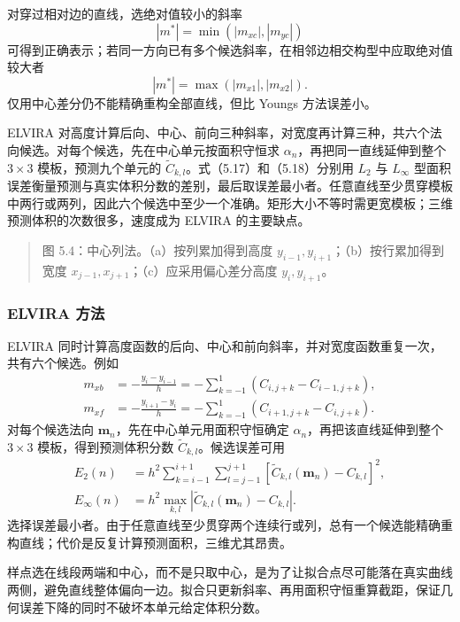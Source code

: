 \documentclass[11pt,a4paper,openany,fontset=none]{ctexbook}
\begin{document}
对穿过相对边的直线，选绝对值较小的斜率
\begin{equation}
|m^*|=\min(|m_{xc}|,|m_{yc}|)
\tag{5.14}
\end{equation}
可得到正确表示；若同一方向已有多个候选斜率，在相邻边相交构型中应取绝对值较大者
\begin{equation}
|m^*|=\max(|m_{x1}|,|m_{x2}|).
\tag{5.15}
\end{equation}
仅用中心差分仍不能精确重构全部直线，但比 Youngs 方法误差小。

ELVIRA 对高度计算后向、中心、前向三种斜率，对宽度再计算三种，共六个法向候选。对每个候选，先在中心单元按面积守恒求 $\alpha_n$，再把同一直线延伸到整个 $3\times3$ 模板，预测九个单元的 $\widetilde C_{k,l}$。式（5.17）和（5.18）分别用 $L_2$ 与 $L_\infty$ 型面积误差衡量预测与真实体积分数的差别，最后取误差最小者。任意直线至少贯穿模板中两行或两列，因此六个候选中至少一个准确。矩形大小不等时需更宽模板；三维预测体积的次数很多，速度成为 ELVIRA 的主要缺点。

\begin{quote}\small 图 5.4：中心列法。（a）按列累加得到高度 $y_{i-1},y_{i+1}$；（b）按行累加得到宽度 $x_{j-1},x_{j+1}$；（c）应采用偏心差分高度 $y_i,y_{i+1}$。\end{quote}
\subsubsection{ELVIRA 方法}

ELVIRA 同时计算高度函数的后向、中心和前向斜率，并对宽度函数重复一次，共有六个候选。例如
\begin{align}
m_{xb}&=-\frac{y_i-y_{i-1}}{h}
=-\sum_{k=-1}^{1}(C_{i,j+k}-C_{i-1,j+k}),\\
m_{xf}&=-\frac{y_{i+1}-y_i}{h}
=-\sum_{k=-1}^{1}(C_{i+1,j+k}-C_{i,j+k}).
\tag{5.16}
\end{align}
对每个候选法向 $\bm m_n$，先在中心单元用面积守恒确定 $\alpha_n$，再把该直线延伸到整个 $3\times3$ 模板，得到预测体积分数 $\widetilde C_{k,l}$。候选误差可用
\begin{align}
E_2(n)&=h^2\sum_{k=i-1}^{i+1}\sum_{l=j-1}^{j+1}
[\widetilde C_{k,l}(\bm m_n)-C_{k,l}]^2,
\tag{5.17}\\
E_\infty(n)&=h^2\max_{k,l}|\widetilde C_{k,l}(\bm m_n)-C_{k,l}|.
\tag{5.18}
\end{align}
选择误差最小者。由于任意直线至少贯穿两个连续行或列，总有一个候选能精确重构直线；代价是反复计算预测面积，三维尤其昂贵。

样点选在线段两端和中心，而不是只取中心，是为了让拟合点尽可能落在真实曲线两侧，避免直线整体偏向一边。拟合只更新斜率、再用面积守恒重算截距，保证几何误差下降的同时不破坏本单元给定体积分数。
\end{document}

